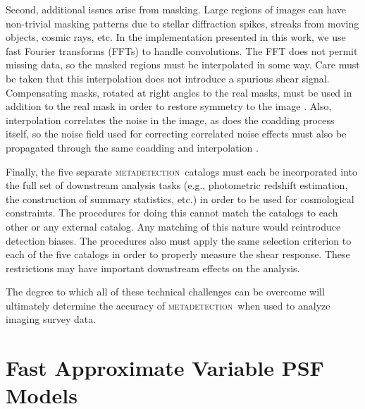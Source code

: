 \documentclass[fleqn,useAMS,usenatbib]{mnras}
\newcommand{\mdet}{\textsc{metadetection}}
\begin{document}
Second, additional issues arise from masking. Large regions of images can have
non-trivial masking patterns due to stellar diffraction spikes, streaks from
moving objects, cosmic rays, etc. In the implementation presented in this work,
we use fast Fourier transforms (FFTs) to handle convolutions. The FFT does not
permit missing data, so the masked regions must be interpolated in some way.
Care must be taken that this interpolation does not introduce a spurious shear
signal.  Compensating masks, rotated at right angles to the real masks, must be
used in addition to the real mask in order to restore symmetry to the image
\citep{SheldonMcal2017}.  Also, interpolation correlates the noise in the
image, as does the coadding process itself, so the noise field used for
correcting correlated noise effects must also be propagated through the same
coadding and interpolation \citep{SheldonMcal2017,ArmstrongCoadd}.

Finally, the five separate \mdet\ catalogs must each be incorporated into the
full set of downstream analysis tasks (e.g., photometric redshift estimation,
the construction of summary statistics, etc.) in order to be used for
cosmological constraints. The procedures for doing this cannot match the
catalogs to each other or any external catalog. Any matching of this nature would
reintroduce detection biases. The procedures also must apply the same
selection criterion to each of the five catalogs in order to properly measure
the shear response. These restrictions may have important downstream effects on
the analysis.

The degree to which all of these technical challenges can be overcome will
ultimately determine the accuracy of \mdet\ when used to analyze imaging survey
data.




\appendix

\section{Fast Approximate Variable PSF Models}\label{app:pspsf}
\end{document}
